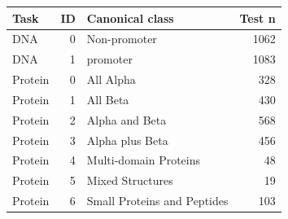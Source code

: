 \begin{tabular}{lrlr}
\toprule
Task & ID & Canonical class & Test n \\
\midrule
DNA & 0 & Non-promoter & 1062 \\
DNA & 1 & promoter & 1083 \\
Protein & 0 & All Alpha & 328 \\
Protein & 1 & All Beta & 430 \\
Protein & 2 & Alpha and Beta & 568 \\
Protein & 3 & Alpha plus Beta & 456 \\
Protein & 4 & Multi-domain Proteins & 48 \\
Protein & 5 & Mixed Structures & 19 \\
Protein & 6 & Small Proteins and Peptides & 103 \\
\bottomrule
\end{tabular}
